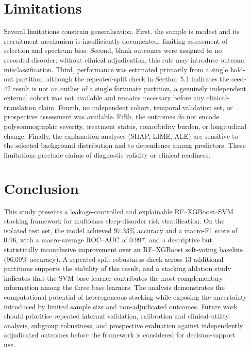 \documentclass{elektr}
\begin{document}
\section{Limitations}
Several limitations constrain generalisation. First, the sample is modest and its recruitment mechanism is insufficiently documented, limiting assessment of selection and spectrum bias. Second, blank outcomes were assigned to no recorded disorder; without clinical adjudication, this rule may introduce outcome misclassification. Third, performance was estimated primarily from a single hold-out partition; although the repeated-split check in Section~5.1 indicates the seed-42 result is not an outlier of a single fortunate partition, a genuinely independent external cohort was not available and remains necessary before any clinical-translation claim. Fourth, no independent cohort, temporal validation set, or prospective assessment was available. Fifth, the outcomes do not encode polysomnographic severity, treatment status, comorbidity burden, or longitudinal change. Finally, the explanation analyses (SHAP, LIME, ALE) are sensitive to the selected background distribution and to dependence among predictors. These limitations preclude claims of diagnostic validity or clinical readiness.

\section{Conclusion}
This study presents a leakage-controlled and explainable RF--XGBoost--SVM stacking framework for multiclass sleep-disorder risk stratification. On the isolated test set, the model achieved 97.33\% accuracy and a macro-F1 score of 0.96, with a macro-average ROC--AUC of 0.997, and a descriptive but statistically inconclusive improvement over an RF--XGBoost soft-voting baseline (96.00\% accuracy). A repeated-split robustness check across 13 additional partitions supports the stability of this result, and a stacking ablation study indicates that the SVM base learner contributes the most complementary information among the three base learners. The analysis demonstrates the computational potential of heterogeneous stacking while exposing the uncertainty introduced by limited sample size and non-adjudicated outcomes. Future work should prioritise repeated internal validation, calibration and clinical-utility analysis, subgroup robustness, and prospective evaluation against independently adjudicated outcomes before the framework is considered for decision-support use.
\end{document}
